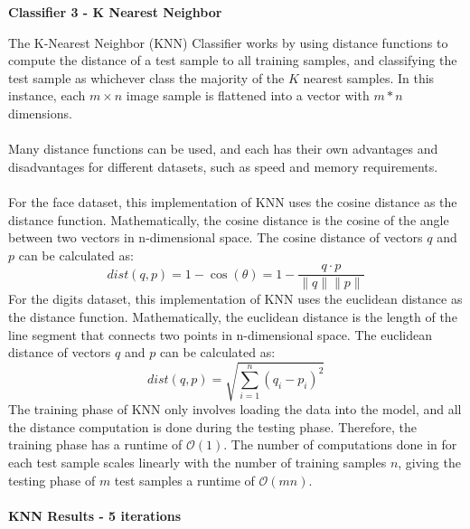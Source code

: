\documentclass[11pt]{article}
\begin{document}
    \newpage
    \begin{center}
        \Large
        \textbf{Classifier 3 - K Nearest Neighbor}
    \end{center}
    \normalsize
    The K-Nearest Neighbor (KNN) Classifier works by using distance functions to compute
    the distance of a test sample to all training samples, and classifying the test sample
    as whichever class the majority of the $K$ nearest samples.
    In this instance, each $m \times n$ image sample is flattened into a vector with $m*n$ dimensions.\\\\
    Many distance functions can be used, and each has their own advantages and disadvantages for
    different datasets, such as speed and memory requirements.\\\\
    For the face dataset, this implementation of KNN uses the cosine distance as the distance function.
    Mathematically, the cosine distance is the cosine of the angle between two vectors in n-dimensional space.
    The cosine distance of vectors $q$ and $p$ can be calculated as:
    \[dist\left(q, p\right) = 1-\cos(\theta) = 1-\frac{q \cdot p}{\|q\|\|p\|}\]
    For the digits dataset, this implementation of KNN uses the euclidean distance as the distance function.
    Mathematically, the euclidean distance is the length of the line segment that connects two points in n-dimensional space.
    The euclidean distance of vectors $q$ and $p$ can be calculated as:
    \[dist\left(q, p\right) = \sqrt{\sum_{i=1}^{n}\left(q_i-p_i\right)^2}\]
    The training phase of KNN only involves loading the data into the model, and all the distance computation
    is done during the testing phase.
    Therefore, the training phase has a runtime of $\mathcal{O}(1)$.
    The number of computations done in for each test sample scales linearly with the number
    of training samples $n$, giving the testing phase of $m$ test samples a runtime of $\mathcal{O}(mn)$.\\\\
    \large
    \textbf{KNN Results - 5 iterations}
    \normalsize
\end{document}
